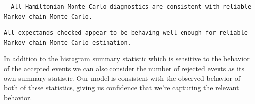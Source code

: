 \documentclass[
  letterpaper,
  DIV=11,
  numbers=noendperiod]{scrartcl}
\newenvironment{Shaded}{\begin{snugshade}}{\end{snugshade}}
\newcommand{\AttributeTok}[1]{\textcolor[rgb]{0.40,0.45,0.13}{#1}}
\newcommand{\ConstantTok}[1]{\textcolor[rgb]{0.56,0.35,0.01}{#1}}
\newcommand{\DecValTok}[1]{\textcolor[rgb]{0.68,0.00,0.00}{#1}}
\newcommand{\FloatTok}[1]{\textcolor[rgb]{0.68,0.00,0.00}{#1}}
\newcommand{\FunctionTok}[1]{\textcolor[rgb]{0.28,0.35,0.67}{#1}}
\newcommand{\NormalTok}[1]{\textcolor[rgb]{0.00,0.23,0.31}{#1}}
\newcommand{\OtherTok}[1]{\textcolor[rgb]{0.00,0.23,0.31}{#1}}
\newcommand{\SpecialCharTok}[1]{\textcolor[rgb]{0.37,0.37,0.37}{#1}}
\newcommand{\StringTok}[1]{\textcolor[rgb]{0.13,0.47,0.30}{#1}}
\begin{document}
\begin{verbatim}
  All Hamiltonian Monte Carlo diagnostics are consistent with reliable
Markov chain Monte Carlo.
\end{verbatim}

\begin{Shaded}
\end{Shaded}

\begin{verbatim}
All expectands checked appear to be behaving well enough for reliable
Markov chain Monte Carlo estimation.
\end{verbatim}

In addition to the histogram summary statistic which is sensitive to the
behavior of the accepted events we can also consider the number of
rejected events as its own summary statistic. Our model is consistent
with the observed behavior of both of these statistics, giving us
confidence that we're capturing the relevant behavior.

\begin{Shaded}
\end{Shaded}
\end{document}
